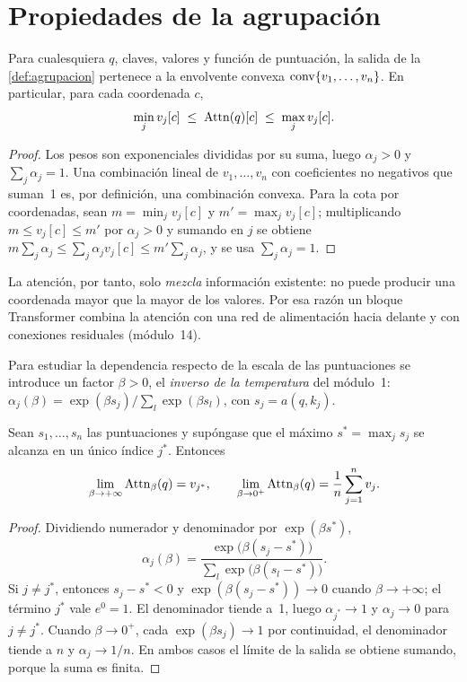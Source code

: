 \section{Propiedades de la agrupación}

\begin{proposicion}\label{prop:convexa}
Para cualesquiera $q$, claves, valores y función de puntuación, la salida de la \cref{def:agrupacion} pertenece a la envolvente convexa $\operatorname{conv}\{v_1,\dots,v_n\}$. En particular, para cada coordenada $c$,
\[
\min_j v_j[c]\;\le\;\operatorname{Attn}(q)[c]\;\le\;\max_j v_j[c].
\]
\end{proposicion}

\begin{proof}
Los pesos son exponenciales divididas por su suma, luego $\alpha_j>0$ y $\sum_j\alpha_j=1$. Una combinación lineal de $v_1,\dots,v_n$ con coeficientes no negativos que suman~1 es, por definición, una combinación convexa. Para la cota por coordenadas, sean $m=\min_jv_j[c]$ y $m'=\max_jv_j[c]$; multiplicando $m\le v_j[c]\le m'$ por $\alpha_j>0$ y sumando en $j$ se obtiene $m\sum_j\alpha_j\le\sum_j\alpha_jv_j[c]\le m'\sum_j\alpha_j$, y se usa $\sum_j\alpha_j=1$.
\end{proof}

La atención, por tanto, solo \emph{mezcla} información existente: no puede producir una coordenada mayor que la mayor de los valores. Por esa razón un bloque Transformer combina la atención con una red de alimentación hacia delante y con conexiones residuales (módulo~14).

Para estudiar la dependencia respecto de la escala de las puntuaciones se introduce un factor $\beta>0$, el \emph{inverso de la temperatura} del módulo~1: $\alpha_j(\beta)=\exp(\beta s_j)/\sum_l\exp(\beta s_l)$, con $s_j=a(q,k_j)$.

\begin{teorema}\label{teo:limites}
Sean $s_1,\dots,s_n$ las puntuaciones y supóngase que el máximo $s^{\ast}=\max_js_j$ se alcanza en un único índice $j^{\ast}$. Entonces
\[
\lim_{\beta\to+\infty}\operatorname{Attn}_\beta(q)=v_{j^{\ast}},\qquad
\lim_{\beta\to 0^{+}}\operatorname{Attn}_\beta(q)=\frac{1}{n}\sum_{j=1}^{n}v_j .
\]
\end{teorema}

\begin{proof}
Dividiendo numerador y denominador por $\exp(\beta s^{\ast})$,
\[
\alpha_j(\beta)=\frac{\exp\bigl(\beta(s_j-s^{\ast})\bigr)}{\sum_l\exp\bigl(\beta(s_l-s^{\ast})\bigr)} .
\]
Si $j\ne j^{\ast}$, entonces $s_j-s^{\ast}<0$ y $\exp(\beta(s_j-s^{\ast}))\to 0$ cuando $\beta\to+\infty$; el término $j^{\ast}$ vale $e^{0}=1$. El denominador tiende a~1, luego $\alpha_{j^{\ast}}\to 1$ y $\alpha_j\to 0$ para $j\ne j^{\ast}$. Cuando $\beta\to 0^{+}$, cada $\exp(\beta s_j)\to 1$ por continuidad, el denominador tiende a $n$ y $\alpha_j\to 1/n$. En ambos casos el límite de la salida se obtiene sumando, porque la suma es finita.
\end{proof}

